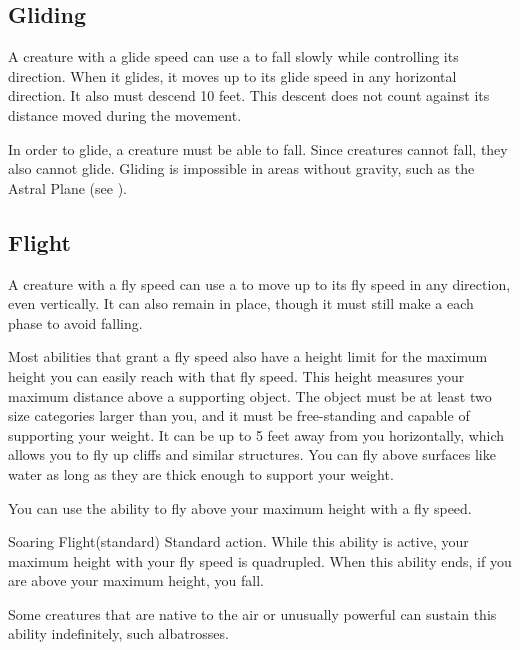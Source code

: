   \subsection{Gliding}\label{Gliding}
    A creature with a glide speed can use a  to fall slowly while controlling its direction.
    When it glides, it moves up to its glide speed in any horizontal direction.
    It also must descend 10 feet.
    This descent does not count against its distance moved during the movement.

    In order to glide, a creature must be able to fall.
    Since  creatures cannot fall, they also cannot glide.
    Gliding is impossible in areas without gravity, such as the Astral Plane (see ).

  \subsection{Flight}\label{Flight}
    A creature with a fly speed can use a  to move up to its fly speed in any direction, even vertically.
    It can also remain in place, though it must still make a  each phase to avoid falling.

     Most abilities that grant a fly speed also have a height limit for the maximum height you can easily reach with that fly speed.
    This height measures your maximum distance above a supporting object.
    The object must be at least two size categories larger than you, and it must be free-standing and capable of supporting your weight.
    It can be up to 5 feet away from you horizontally, which allows you to fly up cliffs and similar structures.
    You can fly above surfaces like water as long as they are thick enough to support your weight.

    You can use the  ability to fly above your maximum height with a fly speed.

    \begin{sustainability}{Soaring Flight}{\atSustain (standard)}
      \abilityusagetime Standard action.
      \rankline
      While this ability is active, your maximum height with your fly speed is quadrupled.
      When this ability ends, if you are above your maximum height, you fall.

      Some creatures that are native to the air or unusually powerful can sustain this ability indefinitely, such albatrosses.
    \end{sustainability}

